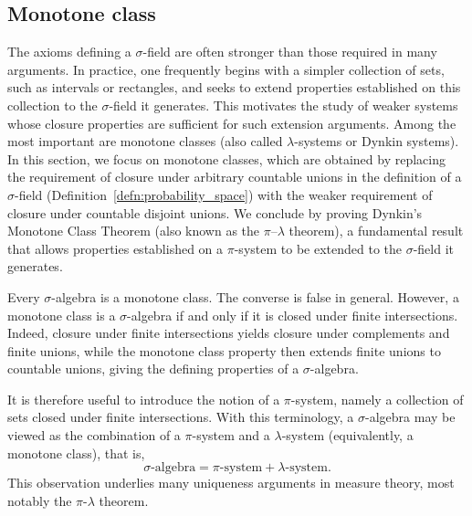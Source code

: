 \documentclass[../Main.tex]{subfiles}
\begin{document}
\subsection{Monotone class}
The axioms defining a $\sigma$-field are often stronger than those required in many arguments. In practice, one frequently begins with a simpler collection of sets, such as intervals or rectangles, and seeks to extend properties established on this collection to the $\sigma$-field it generates. This motivates the study of weaker systems whose closure properties are sufficient for such extension arguments. Among the most important are monotone classes (also called $\lambda$-systems or Dynkin systems). In this section, we focus on monotone classes, which are obtained by replacing the requirement of closure under arbitrary countable unions in the definition of a $\sigma$-field (Definition~\ref{defn:probability_space}) with the weaker requirement of closure under countable disjoint unions. We conclude by proving Dynkin's Monotone Class Theorem (also known as the $\pi$--$\lambda$ theorem), a fundamental result that allows properties established on a $\pi$-system to be extended to the $\sigma$-field it generates.

Every $\sigma$-algebra is a monotone class. The converse is false in general. However, a monotone class is a $\sigma$-algebra if and only if it is closed under finite intersections. Indeed, closure under finite intersections yields closure under complements and finite unions, while the monotone class property then extends finite unions to countable unions, giving the defining properties of a $\sigma$-algebra.

It is therefore useful to introduce the notion of a $\pi$-system, namely a collection of sets closed under finite intersections. With this terminology, a $\sigma$-algebra may be viewed as the combination of a $\pi$-system and a $\lambda$-system (equivalently, a monotone class), that is,
\[
\boxed{\sigma\text{-algebra}=\pi\text{-system}+\lambda\text{-system}.}
\]
This observation underlies many uniqueness arguments in measure theory, most notably the $\pi$-$\lambda$ theorem.
\end{document}
